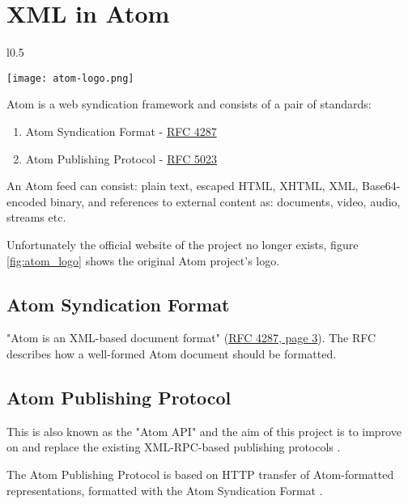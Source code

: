 \chapter{XML in Atom}

\begin{wrapfigure}{l}{0.5\textwidth}
	\vspace{-10pt}
	\begin{center}
		\texttt{[image: atom-logo.png]}
	\end{center}
	\vspace{-10pt}
	\caption{Atom logo.}
	\label{fig:atom_logo}
	\vspace{-10pt}
\end{wrapfigure}

Atom is a web syndication framework and consists of a pair of standards:

\begin{enumerate}
\item Atom Syndication Format - \href{https://tools.ietf.org/html/rfc4287}{RFC 4287}
\item Atom Publishing Protocol - \href{https://tools.ietf.org/html/rfc5023}{RFC 5023}
\end{enumerate}

An Atom feed can consist: plain text, escaped HTML, XHTML, XML, Base64-encoded binary, and references to external content as: documents, video, audio, streams etc.

Unfortunately the official website of the project no longer exists, figure \ref{fig:atom_logo} shows the original Atom project's logo.

\section{Atom Syndication Format}
"Atom is an XML-based document format" (\href{https://tools.ietf.org/html/rfc4287}{RFC 4287, page 3}). The RFC describes how a well-formed Atom document should be formatted.

\section{Atom Publishing Protocol}
This is also known as the "Atom API" and the aim of this project is to improve on and replace the existing XML-RPC-based publishing protocols \cite{xml_com}.

The Atom Publishing Protocol is based on HTTP transfer of Atom-formatted representations, formatted with the Atom Syndication Format \cite{ietf_rfc5023}.

